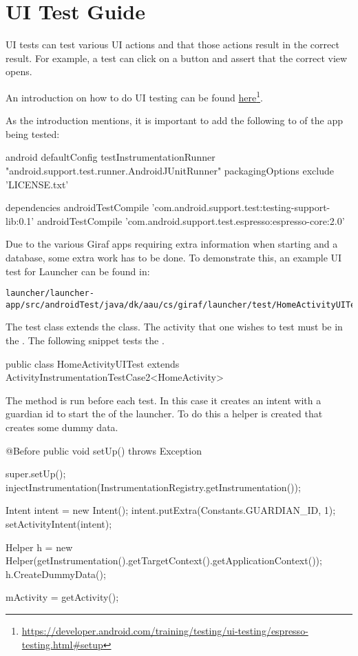 \chapter{UI Test Guide}\label{app:uitestguide}
UI tests can test various UI actions and that those actions result in the correct result. For example, a test can click on a button and assert that the correct view opens.

An introduction on how to do UI testing can be found \href{https://developer.android.com/training/testing/ui-testing/espresso-testing.html\#setup}{here}\footnote{\url{https://developer.android.com/training/testing/ui-testing/espresso-testing.html\#setup}}.

As the introduction mentions, it is important to add the following to  of the app being tested:

\begin{gradlecode}[]
android {
    defaultConfig {
        testInstrumentationRunner "android.support.test.runner.AndroidJUnitRunner" 
    }
    packagingOptions {
        exclude 'LICENSE.txt'
    }
}

dependencies {
    androidTestCompile 'com.android.support.test:testing-support-lib:0.1'
    androidTestCompile 'com.android.support.test.espresso:espresso-core:2.0'
}
\end{gradlecode}

Due to the various Giraf apps requiring extra information when starting and a database, some extra work has to be done. To demonstrate this, an example UI test for Launcher can be found in:

\begin{lstlisting}[breakatwhitespace=false, numbers=none]
launcher/launcher-app/src/androidTest/java/dk/aau/cs/giraf/launcher/test/HomeActivityUITest.java
\end{lstlisting}

The test class extends the  class. The activity that one wishes to test must be in the \mono{<>}. The following snippet tests the .

\begin{javacode}
public class HomeActivityUITest
        extends ActivityInstrumentationTestCase2<HomeActivity>
\end{javacode}

The method  is run before each test. In this case it creates an intent with a guardian id to start the  of the launcher. To do this a helper is created that creates some dummy data.
\begin{javacode}
@Before
public void setUp() throws Exception {
    super.setUp();
    injectInstrumentation(InstrumentationRegistry.getInstrumentation());

    Intent intent = new Intent();
    intent.putExtra(Constants.GUARDIAN_ID, 1);
    setActivityIntent(intent);

    Helper h = new Helper(getInstrumentation().getTargetContext().getApplicationContext());
    h.CreateDummyData();

    mActivity = getActivity();
}
\end{javacode}

